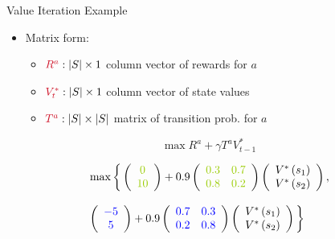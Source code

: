 \documentclass[11pt,table]{beamer}
\begin{document}
\begin{frame}{Value Iteration Example}
\begin{itemize}
    \item Matrix form: 

    \begin{itemize}
        \item[] $\textcolor{red1}{R^{a}}:|S| \times 1$ column vector of rewards for $a$ 
        
        \item[]$\textcolor{red1}{V_{t}^{*}}:|S| \times 1$ column vector of state values 
        
        \item[]$\textcolor{red1}{T^{a}}:|S| \times|S|$ matrix of transition prob. for $a$ 
    \end{itemize}
    \end{itemize}
    \vspace{5mm}
$$
\max R^{a}+\gamma T^{a} V_{t-1}^{*}
$$


\begin{align}
& \max _{\operatorname{ }}\bigg\{\left(\begin{array}{c}
\textcolor{fu-green}{0} \\
\textcolor{fu-green}{10}
\end{array}\right)+0.9\left(\begin{array}{ll}
\textcolor{fu-green}{0.3} & \textcolor{fu-green}{0.7} \\
\textcolor{fu-green}{0.8} & \textcolor{fu-green}{0.2}
\end{array}\right)\left(\begin{array}{l}
V^{*}\left(s_{1}\right) \\
V^{*}\left(s_{2}\right)
\end{array}\right),\nonumber\\[2ex] \nonumber & \left(\begin{array}{c}
\textcolor{blue}{-5} \\
\textcolor{blue}{5}
\end{array}\right)+0.9\left(\begin{array}{cc}
\textcolor{blue}{0.7} & \textcolor{blue}{0.3} \\
\textcolor{blue}{0.2} & \textcolor{blue}{0.8}
\end{array}\right)\left(\begin{array}{l}
V^{*}\left(s_{1}\right) \\
V^{*}\left(s_{2}\right)
\end{array}\right)\bigg\}
\end{align}



\end{frame}
\end{document}
